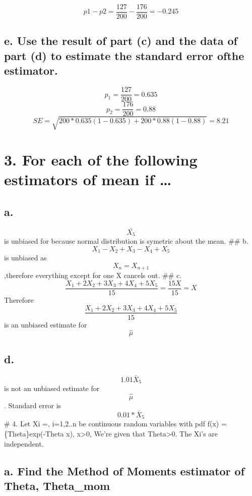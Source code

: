 \documentclass[
]{article}
\begin{document}
\[
p1−p2 = \frac{127}{200} -\frac{176}{200} = -0.245
\]

\hypertarget{e.-use-the-result-of-part-c-and-the-data-of-part-d-to-estimate-the-standard-error-ofthe-estimator.}{%
\subsection{e. Use the result of part (c) and the data of part (d) to
estimate the standard error ofthe
estimator.}\label{e.-use-the-result-of-part-c-and-the-data-of-part-d-to-estimate-the-standard-error-ofthe-estimator.}}

\[
p_1 = \frac{127}{200}=0.635
\] \[
p_2 = \frac{176}{200} = 0.88
\] \[
SE = \sqrt{200*0.635(1-0.635) + 200*0.88(1-0.88)} = 8.21
\]

\hypertarget{for-each-of-the-following-estimators-of-mean-if}{%
\section{3. For each of the following estimators of mean if
\ldots{}}\label{for-each-of-the-following-estimators-of-mean-if}}

\hypertarget{a.}{%
\subsection{a.}\label{a.}}

\[\bar{X_5}\] is unbiased for \mu{]} because normal distribution is
symetric about the mean. \#\# b. \[X_1-X_2+X_3-X_4+X_5\] is unbiased as
\[X_n=X_{n+1}\],therefore everything except for one X cancels out. \#\#
c. \[
\frac{X_1+2X_2+3X_3+4X_4+5X_5}{15} = \frac{15X}{15} = X
\] Therefore \[\frac{X_1+2X_2+3X_3+4X_4+5X_5}{15}\] is an unbiased
estimate for \[\hat{\mu}\]

\hypertarget{d.}{%
\subsection{d.~}\label{d.}}

\[1.01\bar{X}_5\] is not an unbiased estimate for \[\hat{\mu}\].
Standard error is \[
0.01*\bar{X}_5
\] \# 4. Let Xi =, i=1,2..n be continuous random variables with pdf f(x)
= \{Theta\}exp(-Theta x), x\textgreater0, We're given that
Theta\textgreater0. The Xi's are independent.

\hypertarget{a.-find-the-method-of-moments-estimator-of-theta-theta_mom}{%
\subsection{a. Find the Method of Moments estimator of Theta,
Theta\_mom}\label{a.-find-the-method-of-moments-estimator-of-theta-theta_mom}}
\end{document}
